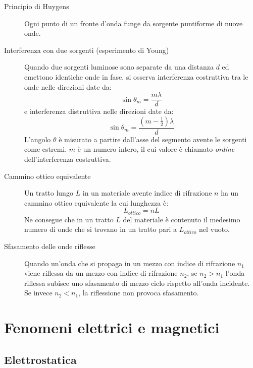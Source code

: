 \documentclass[a4paper,11pt,italian]{article}
\begin{document}
\begin{description}
  \item[Principio di Huygens] 
  Ogni punto di un fronte d'onda funge da sorgente puntiforme di nuove onde.
  
  \item[Interferenza con due sorgenti (esperimento di Young)] 
  Quando due sorgenti luminose sono separate da una distanza $ d $ ed emettono identiche onde in fase, si osserva interferenza costruttiva tra le onde nelle direzioni date da:
  \[ \sin \theta_m = \frac{m\lambda}{d} \]
  e interferenza distruttiva nelle direzioni date da:
  \[ \sin \theta_m = \frac{(m - \frac{1}{2})\lambda}{d} \]
  L'angolo $ \theta $ è misurato a partire dall'asse del segmento avente le sorgenti come estremi. $ m $ è un numero intero, il cui valore è chiamato \emph{ordine} dell'interferenza costruttiva.

  \item[Cammino ottico equivalente] Un tratto lungo $ L $ in un materiale avente indice di rifrazione $ n $ ha un cammino ottico equivalente la cui lunghezza è:
  \[ L_{ottico} = n L \]
  Ne consegue che in un tratto $ L $ del materiale è contenuto il medesimo numero di onde che si trovano in un tratto pari a $ L_{ottico} $ nel vuoto.
  
  \item[Sfasamento delle onde riflesse] 
  Quando un'onda che si propaga in un mezzo con indice di rifrazione $ n_1 $ viene riflessa da un mezzo con indice di rifrazione $ n_2 $, se $ n_2 > n_1 $ l'onda riflessa subisce uno sfasamento di mezzo ciclo rispetto all'onda incidente. Se invece $ n_2 < n_1 $, la riflessione non provoca sfasamento.
\end{description}


\newpage
\section{Fenomeni elettrici e magnetici}

\subsection{Elettrostatica}
\end{document}
